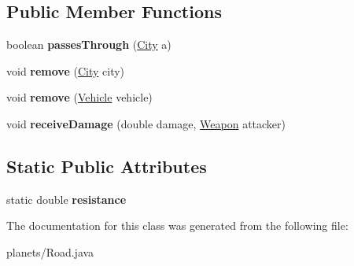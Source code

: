 \subsection*{Public Member Functions}
\begin{DoxyCompactItemize}
\item 
boolean {\bfseries passes\+Through} (\hyperlink{classcities_1_1_city}{City} a)\hypertarget{classplanets_1_1_road_a2ac7558e882a6f1020f27dbd5ab39f19}{}\label{classplanets_1_1_road_a2ac7558e882a6f1020f27dbd5ab39f19}

\item 
void {\bfseries remove} (\hyperlink{classcities_1_1_city}{City} city)\hypertarget{classplanets_1_1_road_a2fe7b0275953e137f73d1d2f3b57299f}{}\label{classplanets_1_1_road_a2fe7b0275953e137f73d1d2f3b57299f}

\item 
void {\bfseries remove} (\hyperlink{classtools_1_1vehicles_1_1_vehicle}{Vehicle} vehicle)\hypertarget{classplanets_1_1_road_aa20f64c93761a632b66d117b925c94b4}{}\label{classplanets_1_1_road_aa20f64c93761a632b66d117b925c94b4}

\item 
void {\bfseries receive\+Damage} (double damage, \hyperlink{classtools_1_1weapons_1_1_weapon}{Weapon} attacker)\hypertarget{classplanets_1_1_road_a81496c0817d976991801850a0dd5fc17}{}\label{classplanets_1_1_road_a81496c0817d976991801850a0dd5fc17}

\end{DoxyCompactItemize}
\subsection*{Static Public Attributes}
\begin{DoxyCompactItemize}
\item 
static double {\bfseries resistance}\hypertarget{classplanets_1_1_road_a299d9b05f3f69a8dcaa3be1e8f9de91e}{}\label{classplanets_1_1_road_a299d9b05f3f69a8dcaa3be1e8f9de91e}

\end{DoxyCompactItemize}


The documentation for this class was generated from the following file\+:\begin{DoxyCompactItemize}
\item 
planets/Road.\+java\end{DoxyCompactItemize}
